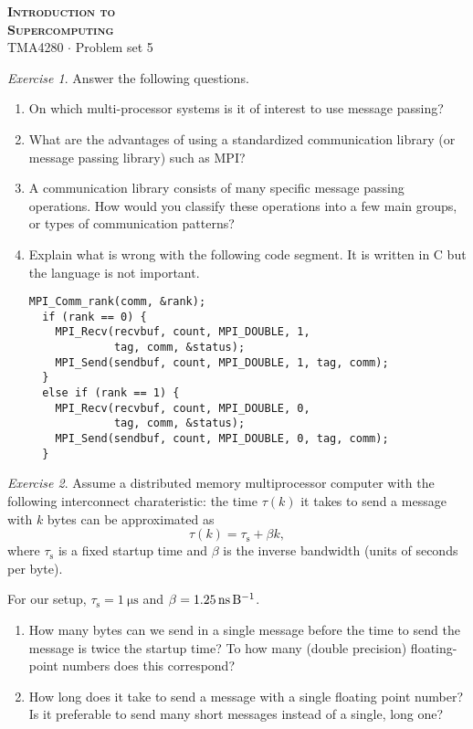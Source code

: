 \documentclass[onecolumn, oneside, a4paper, 11pt]{memoir}
\theoremstyle{remark}
\newtheorem{ex}{Exercise}
\begin{document}
\pagestyle{empty}

\begin{center}
  {\Huge \bfseries \scshape
    Introduction to \\[0.2\baselineskip] Supercomputing} \\[2\baselineskip]
  {\Large TMA4280 $\cdot$ Problem set 5} \\[2\baselineskip]
\end{center}

\begin{ex} Answer the following questions.
  \begin{enumerate}
  \item On which multi-processor systems is it of interest to use message
    passing?
  \item What are the advantages of using a standardized communication library
    (or message passing library) such as MPI?
  \item A communication library consists of many specific message passing
    operations. How would you classify these operations into a few main groups,
    or types of communication patterns?
  \item Explain what is wrong with the following code segment. It is written in
    C but the language is not important.
    \begin{lstlisting}[style=c]
  MPI_Comm_rank(comm, &rank);
  if (rank == 0) {
    MPI_Recv(recvbuf, count, MPI_DOUBLE, 1,
             tag, comm, &status);
    MPI_Send(sendbuf, count, MPI_DOUBLE, 1, tag, comm);
  }
  else if (rank == 1) {
    MPI_Recv(recvbuf, count, MPI_DOUBLE, 0,
             tag, comm, &status);
    MPI_Send(sendbuf, count, MPI_DOUBLE, 0, tag, comm);
  }
    \end{lstlisting}
  \end{enumerate}
\end{ex}

\begin{ex}
  Assume a distributed memory multiprocessor computer with the following
  interconnect charateristic: the time $\tau(k)$ it takes to send a message with
  $k$ bytes can be approximated as
  \[
    \tau(k) = \tau_\text{s} + \beta k,
  \]
  where $\tau_\text{s}$ is a fixed startup time and $\beta$ is the inverse
  bandwidth (units of seconds per byte).

  For our setup, $\tau_\text{s} = \SI{1}{\micro\second}$ and
  $\beta = \SI{1.25}{\nano\second\per\byte}$.
  \begin{enumerate}
  \item How many bytes can we send in a single message before the time to send
    the message is twice the startup time? To how many (double precision)
    floating-point numbers does this correspond?
  \item How long does it take to send a message with a single floating point
    number? Is it preferable to send many short messages instead of a single,
    long one?
  \end{enumerate}
\end{ex}
\end{document}

